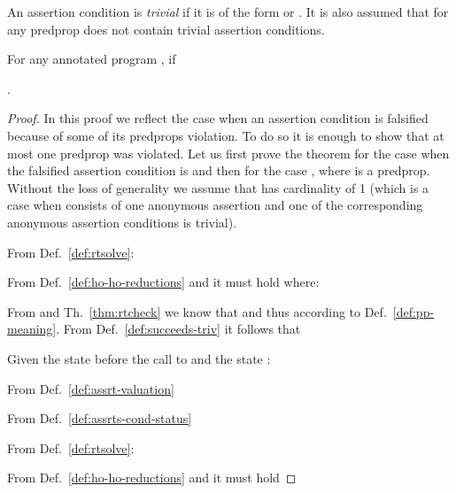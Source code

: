 \documentclass{llncs}
\begin{document}
\begin{definition}
  An assertion condition  is \emph{trivial} if it is of the form
   or . It is also
  assumed that for any predprop   does not contain
  trivial assertion conditions.
\end{definition}

\begin{theorem}
  \label{thm:rtcheckHO}
  For any annotated program , if
   
  .
\end{theorem}

\begin{proof}
In this proof we reflect the case when an assertion condition is
  falsified because of some of its predprops violation.
To do so it is enough to show that at most one predprop was violated.  
Let us first prove the theorem for the case when the falsified
  assertion condition is  and then for the
  case , where  is a predprop.
Without the loss of generality we assume that  has
  cardinality of 1 (which is a case when  consists of one
  anonymous assertion and one of the corresponding anonymous assertion
  conditions is trivial).

\hfill\newline  
  
\newline
   From Def.~\ref{def:rtsolve}: 
  
\newline
   From Def.~\ref{def:ho-ho-reductions} and  it must hold 
   where:
  
   From  and
  Th.~\ref{thm:rtcheck} we know that 
  and thus  according to
  Def.~\ref{def:pp-meaning}.
\newline
   From Def.~\ref{def:succeeds-triv}
  it follows that 
\newline
  
  Given the state  before the call to  and the
  state :
  
  
  
\newline
   From Def.~\ref{def:assrt-valuation}
  
 From Def.~\ref{def:assrts-cond-status} 
  \hfill 

\hfill\newline  
  
\newline
   From Def.~\ref{def:rtsolve}: 
  
\newline
   From Def.~\ref{def:ho-ho-reductions} and  it must hold 
  

\end{proof}
\end{document}
